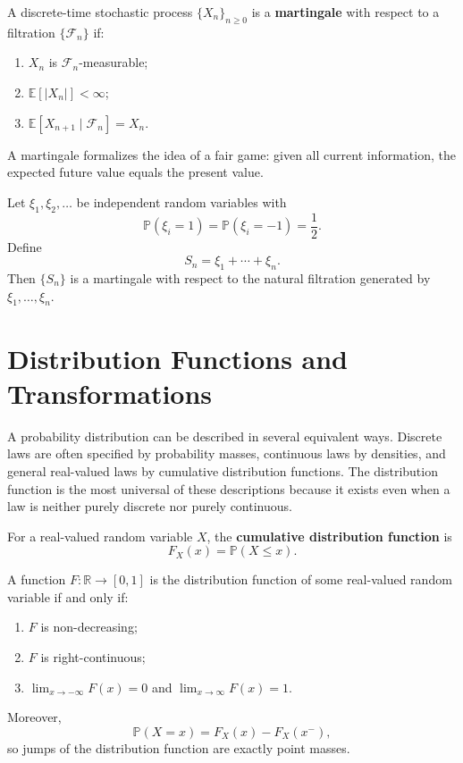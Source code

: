 \begin{definition}[Martingale]
A discrete-time stochastic process $\{X_n\}_{n\geq 0}$ is a \textbf{martingale} with respect to a filtration $\{\mathcal{F}_n\}$ if:
\begin{enumerate}
    \item $X_n$ is $\mathcal{F}_n$-measurable;
    \item $\mathbb{E}[|X_n|]<\infty$;
    \item $\mathbb{E}[X_{n+1}\mid\mathcal{F}_n]=X_n$.
\end{enumerate}
\end{definition}

\begin{remark}
A martingale formalizes the idea of a fair game: given all current information, the expected future value equals the present value.
\end{remark}

\newpage

\begin{example}
Let $\xi_1,\xi_2,\dots$ be independent random variables with
\[
    \mathbb{P}(\xi_i=1)=\mathbb{P}(\xi_i=-1)=\frac12.
\]
Define
\[
    S_n=\xi_1+\cdots+\xi_n.
\]
Then $\{S_n\}$ is a martingale with respect to the natural filtration generated by $\xi_1,\dots,\xi_n$.
\end{example}


\section{Distribution Functions and Transformations}

A probability distribution can be described in several equivalent ways. Discrete laws are often specified by probability masses, continuous laws by densities, and general real-valued laws by cumulative distribution functions. The distribution function is the most universal of these descriptions because it exists even when a law is neither purely discrete nor purely continuous.

\begin{definition}
For a real-valued random variable $X$, the \textbf{cumulative distribution function} is
\[
    F_X(x)=\mathbb{P}(X\leq x).
\]
\end{definition}

\begin{theorem}
A function $F:\mathbb{R}\to[0,1]$ is the distribution function of some real-valued random variable if and only if:
\begin{enumerate}
    \item $F$ is non-decreasing;
    \item $F$ is right-continuous;
    \item $\lim_{x\to-\infty}F(x)=0$ and $\lim_{x\to\infty}F(x)=1$.
\end{enumerate}
Moreover,
\[
    \mathbb{P}(X=x)=F_X(x)-F_X(x^-),
\]
so jumps of the distribution function are exactly point masses.
\end{theorem}

